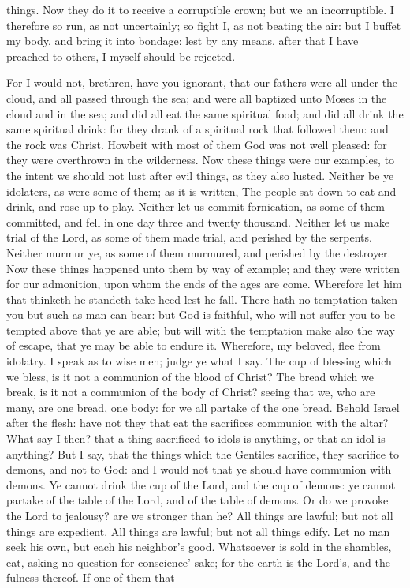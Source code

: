 things. Now they do it to receive a corruptible crown; but we an incorruptible. I therefore so run, as not uncertainly; so fight I, as not beating the air: but I buffet my body, and bring it into bondage: lest by any means, after that I have preached to others, I myself should be rejected. 

For I would not, brethren, have you ignorant, that our fathers were all under the cloud, and all passed through the sea; and were all baptized unto Moses in the cloud and in the sea; and did all eat the same spiritual food; and did all drink the same spiritual drink: for they drank of a spiritual rock that followed them: and the rock was Christ. Howbeit with most of them God was not well pleased: for they were overthrown in the wilderness. Now these things were our examples, to the intent we should not lust after evil things, as they also lusted. Neither be ye idolaters, as were some of them; as it is written, The people sat down to eat and drink, and rose up to play. Neither let us commit fornication, as some of them committed, and fell in one day three and twenty thousand. Neither let us make trial of the Lord, as some of them made trial, and perished by the serpents. Neither murmur ye, as some of them murmured, and perished by the destroyer. Now these things happened unto them by way of example; and they were written for our admonition, upon whom the ends of the ages are come. Wherefore let him that thinketh he standeth take heed lest he fall. There hath no temptation taken you but such as man can bear: but God is faithful, who will not suffer you to be tempted above that ye are able; but will with the temptation make also the way of escape, that ye may be able to endure it.  Wherefore, my beloved, flee from idolatry. I speak as to wise men; judge ye what I say. The cup of blessing which we bless, is it not a communion of the blood of Christ? The bread which we break, is it not a communion of the body of Christ? seeing that we, who are many, are one bread, one body: for we all partake of the one bread. Behold Israel after the flesh: have not they that eat the sacrifices communion with the altar? What say I then? that a thing sacrificed to idols is anything, or that an idol is anything? But I say, that the things which the Gentiles sacrifice, they sacrifice to demons, and not to God: and I would not that ye should have communion with demons. Ye cannot drink the cup of the Lord, and the cup of demons: ye cannot partake of the table of the Lord, and of the table of demons. Or do we provoke the Lord to jealousy? are we stronger than he?  All things are lawful; but not all things are expedient. All things are lawful; but not all things edify. Let no man seek his own, but each his neighbor’s good. Whatsoever is sold in the shambles, eat, asking no question for conscience’ sake; for the earth is the Lord’s, and the fulness thereof. If one of them that 